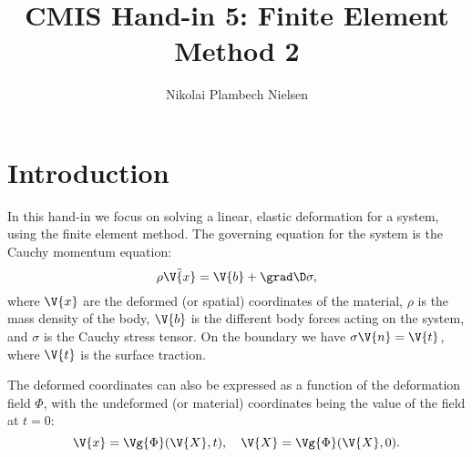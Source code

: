 \documentclass[sigconf]{acmart}
\begin{document}
%
\title{CMIS Hand-in 5: Finite Element Method 2}

\author{Nikolai Plambech Nielsen}


\maketitle

\section{Introduction}
In this hand-in we focus on solving a linear, elastic deformation for a system, using the finite element method. The governing equation for the system is the Cauchy momentum equation:
\begin{equation}\label{key}
	\rho \ddot{\V{x}} = \V{b} + \grad \D \sigma,
\end{equation}
where $ \V{x} $ are the deformed (or spatial) coordinates of the material, $ \rho $ is the mass density of the body, $ \V{b} $ is the different body forces acting on the system, and $ \sigma $ is the Cauchy stress tensor. On the boundary we have $ \sigma \V{n} = \V{t} $, where $ \V{t} $ is the surface traction.

The deformed coordinates can also be expressed as a function of the deformation field $ \Phi $, with the undeformed (or material) coordinates being the value of the field at $ t=0 $:
\begin{equation}\label{key}
	\V{x} = \Vg{\Phi}(\V{X}, t), \quad \V{X} = \Vg{\Phi}(\V{X}, 0).
\end{equation}
\end{document}
